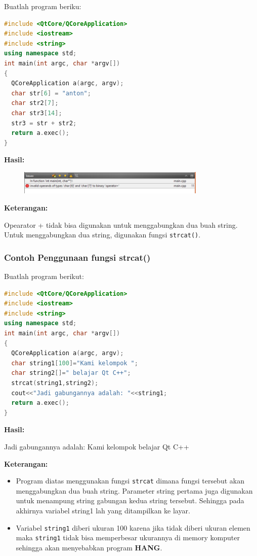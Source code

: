 Buatlah program beriku:

\begin{lstlisting}[language=c++, caption=Penggunaan fungsi strcat(), label=contoh3-23]
#include <QtCore/QCoreApplication>
#include <iostream>
#include <string>
using namespace std;
int main(int argc, char *argv[])
{
  QCoreApplication a(argc, argv);
  char str[6] = "anton";
  char str2[7];
  char str3[14];
  str3 = str + str2;
  return a.exec();
}
\end{lstlisting}

\textbf{Hasil:}

\begin{figure}[htbp]
\centering
\includegraphics[width=0.8\textwidth]{../manuscript/images/capture3-6.PNG}

\end{figure}

\textbf{Keterangan:}

Opearator + tidak bisa digunakan untuk menggabungkan dua buah string.
Untuk menggabungkan dua string, digunakan fungsi \texttt{strcat()}.

\subsubsection*{Contoh  Penggunaan fungsi strcat()}

Buatlah program berikut:

\begin{lstlisting}[language=c++, caption=Penggunaan fungsi strcat(), label=contoh3-24]
#include <QtCore/QCoreApplication>
#include <iostream>
#include <string>
using namespace std;
int main(int argc, char *argv[])
{
  QCoreApplication a(argc, argv);
  char string1[100]="Kami kelompok ";
  char string2[]=" belajar Qt C++";
  strcat(string1,string2);
  cout<<"Jadi gabungannya adalah: "<<string1;
  return a.exec();
}
\end{lstlisting}

\textbf{Hasil:}

\begin{lcverbatim}
Jadi gabungannya adalah:
Kami kelompok belajar Qt C++
\end{lcverbatim}


\textbf{Keterangan:}

\begin{itemize}

\item
  Program diatas menggunakan fungsi \texttt{strcat} dimana fungsi
  tersebut akan menggabungkan dua buah string. Parameter string pertama
  juga digunakan untuk menampung string gabungan kedua string tersebut.
  Sehingga pada akhirnya variabel string1 lah yang ditampilkan ke layar.
\item
  Variabel \texttt{string1} diberi ukuran 100 karena jika tidak diberi
  ukuran elemen maka \texttt{string1} tidak bisa memperbesar ukurannya
  di memory komputer sehingga akan menyebabkan program \textbf{HANG}.
\end{itemize}

